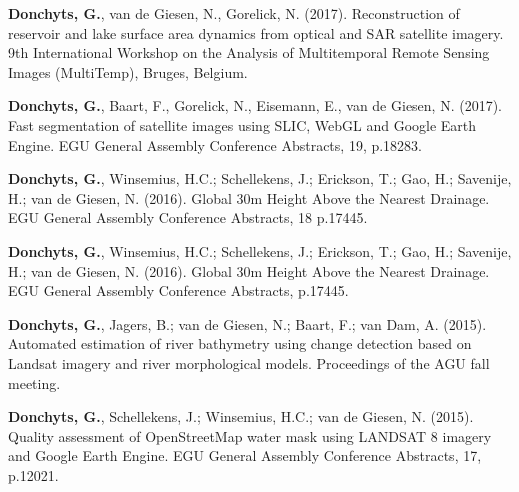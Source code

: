 \begin{etaremune}{\small

\item \textbf{Donchyts, G.}, van de Giesen, N., Gorelick, N. (2017). Reconstruction of reservoir and lake surface area dynamics from optical and SAR satellite imagery. 9th International Workshop on the Analysis of Multitemporal Remote Sensing Images (MultiTemp), Bruges, Belgium.

\item \textbf{Donchyts, G.}, Baart, F., Gorelick, N., Eisemann, E., van de Giesen, N. (2017). Fast segmentation of satellite images using SLIC, WebGL and Google Earth Engine. EGU General Assembly Conference Abstracts, 19, p.18283.

\item \textbf{Donchyts, G.},  Winsemius, H.C.; Schellekens, J.; Erickson, T.; Gao, H.; Savenije, H.; van de Giesen, N. (2016). Global 30m Height Above the Nearest Drainage. EGU General Assembly Conference Abstracts, 18 p.17445.

\item \textbf{Donchyts, G.},  Winsemius, H.C.; Schellekens, J.; Erickson, T.; Gao, H.; Savenije, H.; van de Giesen, N. (2016). Global 30m Height Above the Nearest Drainage. EGU General Assembly Conference Abstracts, p.17445.

\item \textbf{Donchyts, G.},  Jagers, B.; van de Giesen, N.; Baart, F.; van Dam, A. (2015). Automated estimation of river bathymetry using change detection based on Landsat imagery and river morphological models. Proceedings of the AGU fall meeting.

\item \textbf{Donchyts, G.},  Schellekens, J.; Winsemius, H.C.; van de Giesen, N. (2015). Quality assessment of OpenStreetMap water mask using LANDSAT 8 imagery and Google Earth Engine. EGU General Assembly Conference Abstracts, 17, p.12021.

}\end{etaremune}



